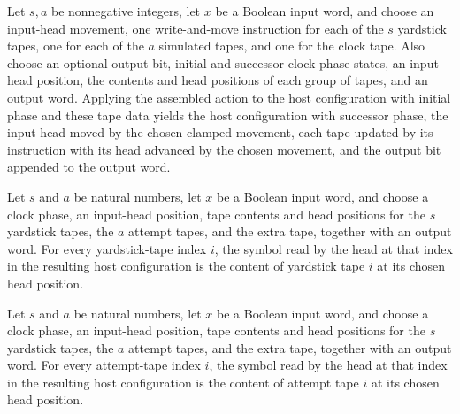 \begin{theorem}
\label{Turing.ClockHost.apply_hostCfg}
\leanok
{}
Let $s,a$ be nonnegative integers, let $x$ be a Boolean input word, and choose an
input-head movement, one write-and-move instruction for each of the $s$ yardstick tapes,
one for each of the $a$ simulated tapes, and one for the clock tape. Also choose an
optional output bit, initial and successor clock-phase states, an input-head position,
the contents and head positions of each group of tapes, and an output word. Applying the
assembled action to the host configuration with initial phase and these tape data yields
the host configuration with successor phase, the input head moved by the chosen clamped
movement, each tape updated by its instruction with its head advanced by the chosen
movement, and the output bit appended to the output word.
\end{theorem}

\begin{theorem}
\label{Turing.ClockHost.hostCfg_symbols_sI}
\leanok
{}
Let $s$ and $a$ be natural numbers, let $x$ be a Boolean input word, and choose a clock
phase, an input-head position, tape contents and head positions for the $s$ yardstick
tapes, the $a$ attempt tapes, and the extra tape, together with an output word. For
every yardstick-tape index $i$, the symbol read by the head at that index in the
resulting host configuration is the content of yardstick tape $i$ at its chosen head
position.
\end{theorem}

\begin{theorem}
\label{Turing.ClockHost.hostCfg_symbols_aI}
\leanok
{}
Let $s$ and $a$ be natural numbers, let $x$ be a Boolean input word, and choose a clock
phase, an input-head position, tape contents and head positions for the $s$ yardstick
tapes, the $a$ attempt tapes, and the extra tape, together with an output word. For
every attempt-tape index $i$, the symbol read by the head at that index in the resulting
host configuration is the content of attempt tape $i$ at its chosen head position.
\end{theorem}

